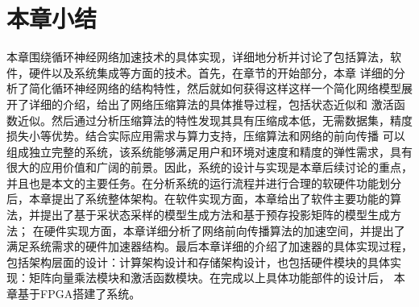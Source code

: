 \section{本章小结}
本章围绕循环神经网络加速技术的具体实现，详细地分析并讨论了包括算法，软件，硬件以及系统集成等方面的技术。首先，在章节的开始部分，本章
详细的分析了简化循环神经网络的结构特性，然后就如何获得这样这样一个简化网络模型展开了详细的介绍，给出了网络压缩算法的具体推导过程，包括状态近似和
激活函数近似。然后通过分析压缩算法的特性发现其具有压缩成本低，无需数据集，精度损失小等优势。结合实际应用需求与算力支持，压缩算法和网络的前向传播
可以组成独立完整的系统，该系统能够满足用户和环境对速度和精度的弹性需求，具有很大的应用价值和广阔的前景。因此，系统的设计与实现是本章后续讨论的重点，
并且也是本文的主要任务。在分析系统的运行流程并进行合理的软硬件功能划分后，本章提出了系统整体架构。在软件实现方面，本章给出了软件主要功能的算法，并提出了基于采状态采样的模型生成方法和基于预存投影矩阵的模型生成方法；
在硬件实现方面，本章详细分析了网络前向传播算法的加速空间，并提出了满足系统需求的硬件加速器结构。最后本章详细的介绍了加速器的具体实现过程，
包括架构层面的设计：计算架构设计和存储架构设计，也包括硬件模块的具体实现：矩阵向量乘法模块和激活函数模块。在完成以上具体功能部件的设计后，
本章基于FPGA搭建了系统。
